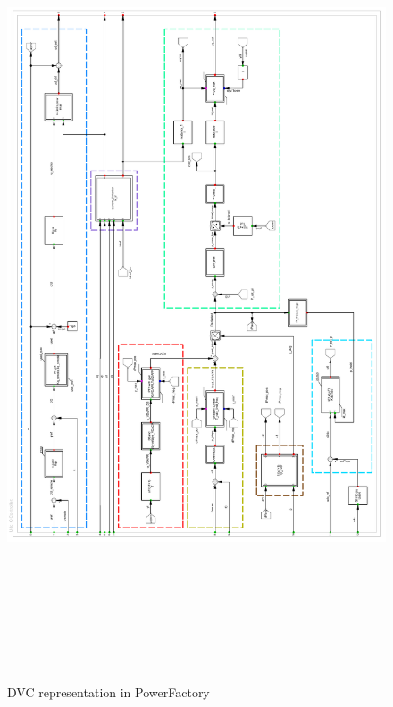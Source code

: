 \begin{figure}[H]
\centering
    \includegraphics[height = 24cm,width =\textwidth]{Diagrams/Appendix_A/Udc_controller_PFD.pdf}
    \caption{DVC representation in PowerFactory \cite{erlich_description_nodate}}
    \label{fig:Udc_controller_PFD}
\end{figure}

